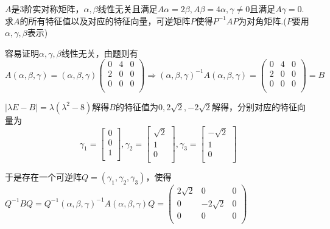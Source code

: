 \documentclass[lang=cn,10pt]{elegantbook}
\begin{document}
\begin{example}
	$A$是3阶实对称矩阵，$\alpha,\beta$线性无关且满足$ A\alpha=2\beta,A\beta=4\alpha,\gamma\ne0$且满足$A\gamma=0$.求$A$的所有特征值以及对应的特征向量，可逆矩阵$P$使得$P^{-1}AP$为对角矩阵.($P$要用$\alpha,\gamma,\beta$表示)
\end{example}
\begin{solution}
	
	容易证明$\alpha,\gamma,\beta$线性无关，由题则有
	\begin{equation*}
		A\left( \alpha ,\beta ,\gamma \right) =\left( \alpha ,\beta ,\gamma \right) \left( \begin{matrix}
			0&		4&		0\\
			2&		0&		0\\
			0&		0&		0\\
		\end{matrix} \right)\Rightarrow \left( \alpha ,\beta ,\gamma \right)^{-1}	A\left( \alpha ,\beta ,\gamma \right)=\left( \begin{matrix}
		0&		4&		0\\
		2&		0&		0\\
		0&		0&		0\\
		\end{matrix}\right)=B
	\end{equation*}
	
$	|\lambda E-B|=\lambda(\lambda^{2}-8)$解得$B$的特征值为$0,2\sqrt{2},-2\sqrt{2}$解得，分别对应的特征向量为
\begin{equation*}
	\gamma_{1}=\left[ \begin{array}{c}
		0\\
		0\\
		1\\
	\end{array} \right],
	\gamma_{2}=\left[ \begin{array}{c}
		\sqrt{2}\\
		1\\
		0\\
	\end{array} \right],
	\gamma_{3}=\left[ \begin{array}{c}
	-\sqrt{2}\\
		1\\
		0\\
	\end{array} \right]
\end{equation*}

于是存在一个可逆阵$Q=(\gamma_{1},\gamma_{2},\gamma_{3})$，使得$Q^{-1}BQ=Q^{-1}\left( \alpha ,\beta ,\gamma \right)^{-1}	A\left( \alpha ,\beta ,\gamma \right)Q=\left( \begin{matrix}
	2\sqrt{2}&		0&		0\\
	0&		-2\sqrt{2}&		0\\
	0&		0&		0\\
\end{matrix}\right)$


\end{solution}
\end{document}
